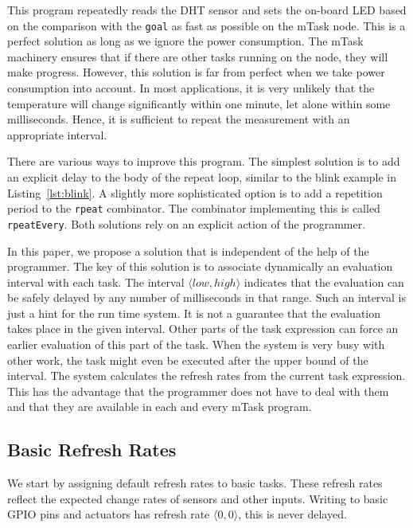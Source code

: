 \documentclass[runningheads]{llncs}
\newcommand{\CleanInline}[1]{\lstinline[language=Clean]!#1!}
\newcommand{\prog}[1]{\CleanInline{#1}}
\begin{document}
This program repeatedly reads the DHT sensor and sets the on-board LED based on the comparison with the \prog{goal} as fast as possible on the mTask node.
This is a perfect solution as long as we ignore the power consumption.
The mTask machinery ensures that if there are other tasks running on the node, they will make progress.
However, this solution is far from perfect when we take power consumption into account.
In most applications, it is very unlikely that the temperature will change significantly within one minute, let alone within some milliseconds.
Hence, it is sufficient to repeat the measurement with an appropriate interval.

There are various ways to improve this program.
The simplest solution is to add an explicit delay to the body of the repeat loop, similar to the blink example in Listing~\ref{lst:blink}.
A slightly more sophisticated option is to add a repetition period to the \prog{rpeat} combinator.
The combinator implementing this is called \prog{rpeatEvery}.
Both solutions rely on an explicit action of the programmer.

In this paper, we propose a solution that is independent of the help of the programmer.
The key of this solution is to associate dynamically an evaluation interval with each task.
The interval $\langle {low}, {high} \rangle$ indicates that the evaluation can be safely delayed by any number of milliseconds in that range.
Such an interval is just a hint for the run time system.
It is not a guarantee that the evaluation takes place in the given interval.
Other parts of the task expression can force an earlier evaluation of this part of the task.
When the system is very busy with other work, the task might even be executed after the upper bound of the interval.
The system calculates the refresh rates from the current task expression.
This has the advantage that the programmer does not have to deal with them and that they are available in each and every mTask program.

\subsection{Basic Refresh Rates}

We start by assigning default refresh rates to basic tasks.
These refresh rates reflect the expected change rates of sensors and other inputs.
Writing to basic GPIO pins and actuators has refresh rate $\langle 0, 0 \rangle$, this is never delayed.
\end{document}
